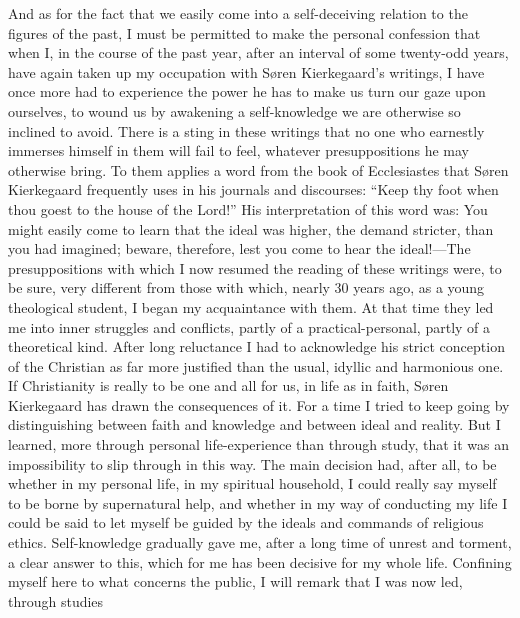 \documentclass[12pt,a4paper]{book}
\newcommand{\opage}[1]{\marginnote{\footnotesize\textit{[#1]}}}
\begin{document}
And as for the fact that we easily come into a self-deceiving relation to
the figures of the past, I must be permitted to make the personal
confession that when I, in the course of the past year, after an interval
of some twenty-odd years, have again taken up my occupation with Søren
Kierkegaard's writings, I have once more had to experience the power he
has to make us turn our gaze upon ourselves, to wound us by awakening a
\opage{3}self-knowledge we are otherwise so inclined to avoid. There is a sting
in these writings that no one who earnestly immerses himself in them will
fail to feel, whatever presuppositions he may otherwise bring. To them
applies a word from the book of Ecclesiastes that Søren Kierkegaard
frequently uses in his journals and discourses: ``Keep thy foot when thou
goest to the house of the Lord!'' His interpretation of this word was:
You might easily come to learn that the ideal was higher, the demand
stricter, than you had imagined; beware, therefore, lest you come to hear
the ideal!---The
presuppositions with which I now resumed the reading of these
writings were, to be sure, very different from those with which, nearly
30 years ago, as a young theological student, I began my acquaintance
with them. At that time they led me into inner struggles and conflicts,
partly of a practical-personal, partly of a theoretical kind. After long
reluctance I had to acknowledge his strict conception of the Christian as
far more justified than the usual, idyllic and harmonious one. If
Christianity is really to be one and all for us, in life as in faith,
Søren Kierkegaard has drawn the consequences of it. For a time I tried to
keep going by distinguishing between faith and knowledge and between
ideal and reality. But I learned, more through personal life-experience
than through study, that it was an impossibility to slip through in this
way. The main decision had, after all, to be whether in my personal
life, in my spiritual household, I could really say myself to be borne by
supernatural help, and whether in my way of conducting my life I could be
said to let myself be guided by the ideals and commands of religious
ethics. Self-knowledge gradually gave me, after a long time of unrest and
torment, a clear answer to this, which for me has been decisive for my
whole life. Confining myself here to what
\opage{4}concerns the public, I will remark that I was now led, through studies
\end{document}
